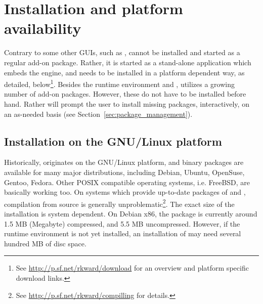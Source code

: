 \section{Installation and platform availability}
\label{sec:installing_starting_RKWard}
Contrary to some other  GUIs, such as ,  cannot be installed and started as a
regular  add-on package. Rather, it is started as a stand-alone application which embeds the
 engine, and needs to be installed in a platform dependent way, as detailed, below\footnote{
  See \url{http://p.sf.net/rkward/download} for an overview and platform specific download links.
}. Besides the
 runtime environment and ,  utilizes a growing number of  add-on packages.
However, these do not have to be installed before hand. Rather  will prompt the user to install
missing packages, interactively, on an as-needed basis (see Section~\ref{sec:package_management}).

\subsection{Installation on the GNU/Linux platform}
Historically,  originates on the GNU/Linux platform, and binary packages are available for many major
distributions, including Debian, Ubuntu, OpenSuse, Gentoo, Fedora. Other POSIX compatible operating systems, i.e. FreeBSD, are basically working too. 
On systems which provide up-to-date packages of  and , compilation from source is generally unproblematic\footnote{
  See \url{http://p.sf.net/rkward/compilling} for details.
}. The exact size of the installation is system dependent. On Debian x86, the package is currently around 1.5 MB (Megabyte) compressed,
and 5.5 MB uncompressed. However, if the  runtime environment is not yet installed, an installation of  may
need several hundred MB of disc space.

